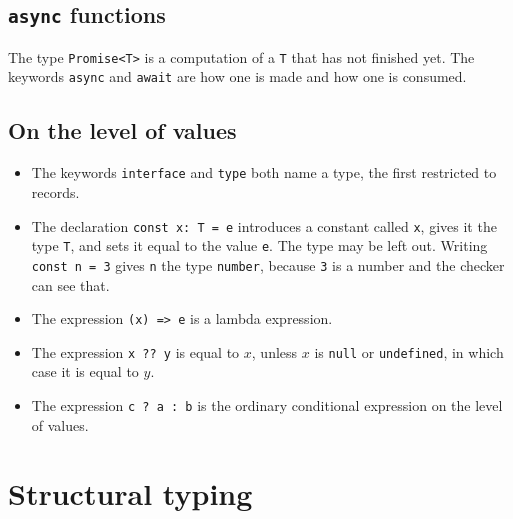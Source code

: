\documentclass[11pt,a4paper]{article}
\begin{document}
\subsection{\texttt{async} functions}

\begin{orestisbox}
The type \texttt{Promise<T>} is a computation of a \texttt{T} that has not finished yet. The
keywords \texttt{async} and \texttt{await} are how one is made and how one is consumed.
\end{orestisbox}

\subsection{On the level of values}

\begin{listbox}
\begin{itemize}\setlength{\itemsep}{2pt}

\item The keywords \texttt{interface} and \texttt{type} both name a type, the first restricted to
      records.

\item The declaration \texttt{const x: T = e} introduces a constant called \texttt{x}, gives it
      the type \texttt{T}, and sets it equal to the value \texttt{e}. The type may be left out.
      Writing \texttt{const n = 3} gives \texttt{n} the type \texttt{number}, because \texttt{3}
      is a number and the checker can see that.

\item The expression \texttt{(x) => e} is a lambda expression.

\item The expression \texttt{x ?? y} is equal to $x$, unless $x$ is \texttt{null} or
      \texttt{undefined}, in which case it is equal to $y$.

\item The expression \texttt{c ? a : b} is the ordinary conditional expression on the level of
      values.

\end{itemize}
\end{listbox}

\newpage

\section{Structural typing}
\label{sec:structural}
\end{document}
